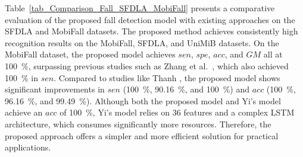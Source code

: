 \documentclass[journal,twoside,web]{ieeecolor}
\begin{document}
\begin{table}[h!]
\centering
\caption{Comparison of the proposed fall detection model with previous studies on \textnormal{(a)} SFDLA and \textnormal{(b)} MobiFall datasets.}
\label{tab_Comparison_Fall_SFDLA_MobiFall}
\footnotesize
{}
\end{table}


Table~\ref{tab_Comparison_Fall_SFDLA_MobiFall} presents a comparative evaluation of the proposed fall detection model with existing approaches on the SFDLA and MobiFall datasets. The proposed method achieves consistently high recognition results on the MobiFall, SFDLA, and UniMiB datasets. On the MobiFall dataset, the proposed model achieves $sen$, $spe$, $acc$, and $GM$ all at 100~\%, surpassing previous studies such as Zhang et al.~\cite{MobiFall2024}, which also achieved 100~\% in $sen$. Compared to studies like Thanh \cite{Thanhfire2019}, the proposed model shows significant improvements in $sen$ (100~\%, 90.16~\%, and 100~\%) and $acc$ (100~\%, 96.16~\%, and 99.49~\%). Although both the proposed model and Yi's model achieve an $acc$ of 100~\%, Yi's model relies on 36 features and a complex LSTM architecture, which consumes significantly more resources. Therefore, the proposed approach offers a simpler and more efficient solution for practical applications.
\end{document}
